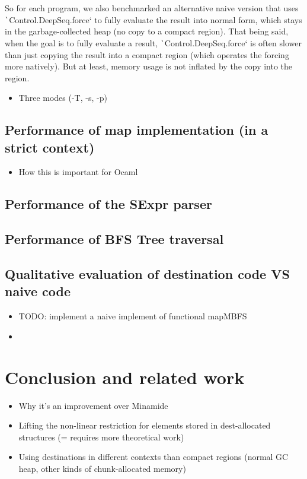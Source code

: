 \documentclass[english]{jflart}
\begin{document}
So for each program, we also benchmarked an alternative naive version that uses \texttt`Control.DeepSeq.force` to fully evaluate the result into normal form, which stays in the garbage-collected heap (no copy to a compact region). That being said, when the goal is to fully evaluate a result, \texttt`Control.DeepSeq.force` is often slower than just copying the result into a compact region (which operates the forcing more natively). But at least, memory usage is not inflated by the copy into the region.

\begin{itemize}
\item Three modes (-T, -s, -p)
\end{itemize}

\subsection{Performance of map implementation (in a strict context)}

\begin{itemize}
\item How this is important for Ocaml
\end{itemize}


\subsection{Performance of the SExpr parser}

\subsection{Performance of BFS Tree traversal}\label{ssec:benchmark-parser}

\subsection{Qualitative evaluation of destination code VS naive code}

\begin{itemize}
\item TODO: implement a naive implement of functional mapMBFS
\item \end{itemize}

\section{Conclusion and related work}
\begin{itemize}
\item Why it's an improvement over Minamide

\item Lifting the non-linear restriction for elements stored in dest-allocated structures (= requires more theoretical work)

\item Using destinations in different contexts than compact regions (normal GC heap, other kinds of chunk-allocated memory)
\end{itemize}
\end{document}

